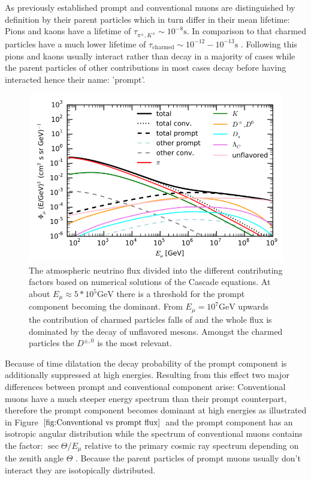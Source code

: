\documentclass[
  tucolor,       %
  BCOR=12mm,     %
  parskip=half,  %
  open=any,      %
  cleardoublepage=plain,  %
]{tudothesis}
\begin{document}
As previously established prompt and conventional muons are distinguished by definition by their parent particles which in turn differ in their mean lifetime:
Pions and kaons have a lifetime of $\tau_{\pi^{\pm},K^{\pm}} \sim 10^{-8}\si{\second}$. In comparison to that charmed particles have a much lower lifetime of $\tau_{\mathrm{charmed}} \sim 10^{-12}-10^{-13} \si{\second}$ \cite{pdg}.
Following this pions and kaons usually interact rather than decay in a majority of cases while the parent particles of other contributions in most cases decay before having interacted hence their name: 'prompt'.
\begin{figure}
  \centering
  \includegraphics[scale=0.35]{Plots/Prompt vs conventional flux}
  \caption{The atmospheric neutrino flux divided into the different contributing factors based on numerical solutions of the Cascade equations. At about $E_{\mu}\approx 5*10^5\si{\giga\electronvolt}$ there is a threshold for the prompt component becoming the dominant. From $E_\mu=10^7\si{\giga\electronvolt}$ upwards the contribution of charmed particles falls of and the whole flux is dominated by the decay of unflavored mesons. Amongst the charmed particles the $D^{\pm,0}$ is the most relevant. \cite{fedynitch2015calculation}}
  \label{fig:Conventional vs prompt flux}
\end{figure}
Because of time dilatation the decay probability of the prompt component is additionally suppressed at high energies. Resulting from this effect two major differences between prompt and conventional component arise:
Conventional muons have a much steeper energy spectrum than their prompt counterpart, therefore the prompt component becomes dominant at high energies as illustrated in Figure $\ref{fig:Conventional vs prompt flux}$ \cite{fedynitch2015calculation} and the prompt component has an isotropic angular distribution while the spectrum of conventional muons contains the factor: $\sec \Theta / E_{\mu}$ relative to the primary cosmic ray spectrum depending on the zenith angle $\Theta$ \cite{gaisser_engel_resconi_2016}.
Because the parent particles of prompt muons usually don't interact they are isotopically distributed.
\cite{Illana_2011} \cite{gaisser_engel_resconi_2016}
\end{document}
